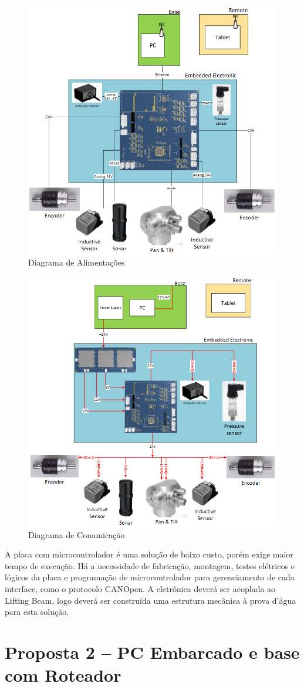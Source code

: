 \begin{figure}[H]
    \centering
    \includegraphics[width=0.5\columnwidth]{figs/eletronica/2.png}
    \caption{Diagrama de Alimentações}
    \label{alimentacao_placa}
\end{figure}

\begin{figure}[H]
    \centering
    \includegraphics[width=0.5\columnwidth]{figs/eletronica/3.png}
    \caption{Diagrama de Comunicação}
    \label{com_placa}
\end{figure}
 
A placa com microcontrolador é uma solução de baixo custo, porém exige maior tempo de execução. Há a necessidade de fabricação, montagem, testes elétricos e lógicos da placa e programação de microcontrolador para gerenciamento de cada interface, como o protocolo CANOpen. 
A eletrônica deverá ser acoplada ao Lifting Beam, logo deverá ser construída uma estrutura mecânica à prova d’água para esta solução.


\section{Proposta 2 – PC Embarcado e base com Roteador}

